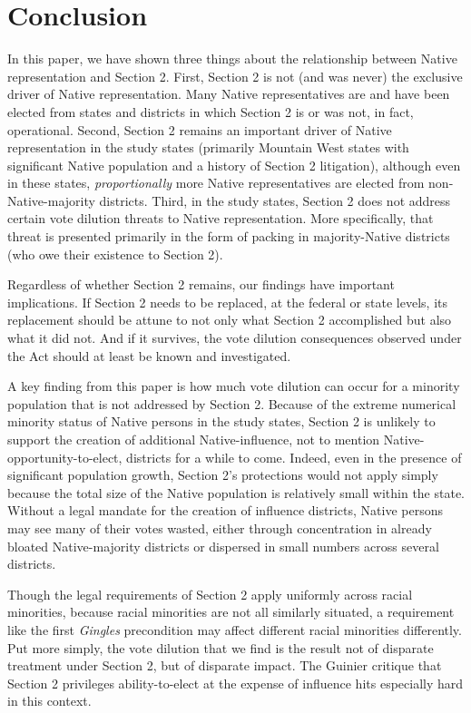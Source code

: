 \documentclass[12pt]{article}
\begin{document}
\section{Conclusion}

In this paper, we have shown three things about the relationship between Native representation and Section 2.  First, Section 2 is not (and was never) the exclusive driver of Native representation.  Many Native representatives are and have been elected from states and districts in which Section 2 is or was not, in fact, operational.  Second, Section 2 remains an important driver of Native representation in the study states (primarily Mountain West states with significant Native population and a history of Section 2 litigation), although even in these states, \textit{proportionally} more Native representatives are elected from non-Native-majority districts.  Third, in the study states, Section 2 does not address certain vote dilution threats to Native representation.  More specifically, that threat is presented primarily in the form of packing in majority-Native districts (who owe their existence to Section 2).

Regardless of whether Section 2 remains, our findings have important implications.  If Section 2 needs to be replaced, at the federal or state levels, its replacement should be attune to not only what Section 2 accomplished but also what it did not.  And if it survives, the vote dilution consequences observed under the Act should at least be known and investigated.

A key finding from this paper is how much vote dilution can occur for a minority population that is not addressed by Section 2.  Because of the extreme numerical minority status of Native persons in the study states, Section 2 is unlikely to support the creation of additional Native-influence, not to mention Native-opportunity-to-elect, districts for a while to come.  Indeed, even in the presence of significant population growth, Section 2's protections would not apply simply because the total size of the Native population is relatively small within the state.  Without a legal mandate for the creation of influence districts, Native persons may see many of their votes wasted, either through concentration in already bloated Native-majority districts or dispersed in small numbers across several districts.

 Though the legal requirements of Section 2 apply uniformly across racial minorities, because racial minorities are not all similarly situated, a requirement like the first \textit{Gingles} precondition may affect different racial minorities differently.  Put more simply, the vote dilution that we find is the result not of disparate treatment under Section 2, but of disparate impact.  The Guinier critique that Section 2 privileges ability-to-elect at the expense of influence hits especially hard in this context.
\end{document}
